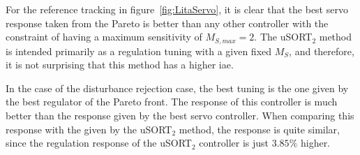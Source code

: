For the reference tracking in figure~\ref{fig:LitaServo}, it is clear that the best servo response taken from the Pareto is better than any other controller with the constraint of having a maximum sensitivity of $M_{S,max} = 2$. The uSORT$_2$ method is intended primarily as a regulation tuning with a given fixed $M_S$, and therefore, it is not surprising that this method has a higher \gls{iae}.

In the case of the disturbance rejection case, the best tuning is the one given by the best regulator of the Pareto front. The response of this controller is much better than the response given by the best servo controller. When comparing this response with the given by the uSORT$_2$ method, the response is quite similar, since the regulation response of the uSORT$_2$ controller is just $3.85\%$ higher.

